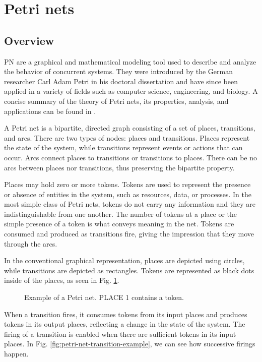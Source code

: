 \section{Petri nets}

\subsection{Overview}

\acrfull{PN} are a graphical and mathematical modeling tool
used to describe and analyze the behavior of concurrent systems.
They were introduced by the German researcher
Carl Adam Petri in his doctoral dissertation \cite{petri1962}
and have since been applied in a variety of fields
such as computer science, engineering, and biology.
A concise summary of the theory of Petri nets,
its properties, analysis, and applications can be found in \cite{murata1989}.

A Petri net is a bipartite, directed graph
consisting of a set of places, transitions, and arcs.
There are two types of nodes: places and transitions.
Places represent the state of the system,
while transitions represent events or actions that can occur.
Arcs connect places to transitions or transitions to places.
There can be no arcs between places nor transitions,
thus preserving the bipartite property.

Places may hold zero or more tokens.
Tokens are used to represent the presence or absence of entities in the system,
such as resources, data, or processes.
In the most simple class of Petri nets,
tokens do not carry any information and they are indistinguishable from one another.
The number of tokens at a place or the simple presence of a token is
what conveys meaning in the net.
Tokens are consumed and produced as transitions fire,
giving the impression that they move through the arcs.

In the conventional graphical representation,
places are depicted using circles, while transitions are depicted as rectangles.
Tokens are represented as black dots inside of the places,
as seen in Fig. \ref{fig:petri-net-example}.

\begin{figure}[!htb]
      \centering
      
      \caption{Example of a Petri net. \uppercase{PLACE 1} contains a token.}
      \label{fig:petri-net-example}
\end{figure}

When a transition fires, it consumes tokens from its input places and
produces tokens in its output places, reflecting a change in the state of the system.
The firing of a transition is enabled when there are sufficient tokens in its input places.
In Fig. \ref{fig:petri-net-transition-example}, we can see how successive firings happen.

